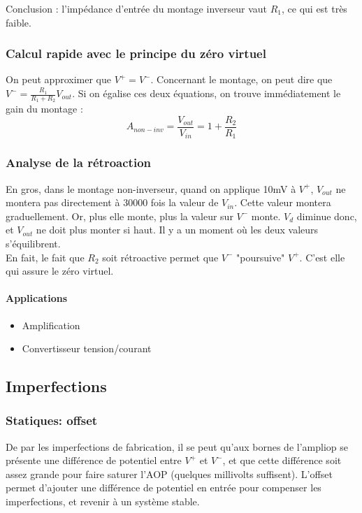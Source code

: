 \documentclass[a4paper]{article}
\begin{document}
    Conclusion : l'impédance d'entrée du montage inverseur vaut $R_1$, ce qui est
    très faible.

    \subsubsection{Calcul rapide avec le principe du zéro virtuel}
    On peut approximer que $V^+ = V^-$. Concernant le montage, on peut dire que
    $V^- = \frac{R_1}{R_1+R_2}V_{out}$. Si on égalise ces deux équations, on trouve
    immédiatement le gain du montage : 
    $$ A_{non-inv} = \frac{V_{out}}{V_{in}} = 1 + \frac{R_2}{R_1} $$

    \subsubsection{Analyse de la rétroaction}
    En gros, dans le montage non-inverseur, quand on applique 10mV à $V^+$, 
    $V_{out}$ ne montera pas directement à 30000 fois la valeur de $V_{in}$.
    Cette valeur montera graduellement. Or, plus elle monte, plus la valeur 
    sur $V^-$ monte. $V_d$ diminue donc, et $V_{out}$ ne doit plus monter
    si haut. Il y a un moment où les deux valeurs s'équilibrent.\\

    En fait, le fait que $R_2$ soit rétroactive permet que $V^-$ "poursuive" $V^+$.
    C'est elle qui assure le zéro virtuel.

    \paragraph{Applications}
    \begin{itemize}
        \item Amplification
        \item Convertisseur tension/courant
    \end{itemize}


    \subsection{Imperfections}
    \subsubsection{Statiques: offset}
    De par les imperfections de fabrication, il se peut qu'aux bornes de l'ampliop
    se présente une différence de potentiel entre $V^+$ et $V^-$, et que cette
    différence soit assez grande pour faire saturer l'AOP (quelques millivolts suffisent).
    L'offset permet d'ajouter une différence de potentiel en entrée pour compenser les
    imperfections, et revenir à un système stable.
\end{document}
